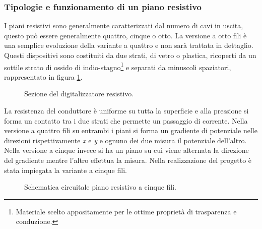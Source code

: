 \documentclass[11pt]{article}
\begin{document}
\subsubsection{Tipologie e funzionamento di un piano resistivo}\label{tipofunz}
I piani resistivi sono generalmente caratterizzati dal numero di cavi in uscita, questo può essere generalmente quattro, cinque o otto. La versione a otto fili è una semplice evoluzione della variante a quattro e non sarà trattata in dettaglio. Questi dispositivi sono costituiti da due strati, di vetro o plastica, ricoperti da un sottile strato di ossido di indio-stagno\footnote{Materiale scelto appositamente per le ottime proprietà di trasparenza e conduzione.} e separati da minuscoli spaziatori, rappresentato in figura \ref{fig:sezione}. 
\begin{figure}[h!]
\centering
{}
\caption{Sezione del digitalizzatore resistivo.} \label{fig:sezione}
\end{figure}
La resistenza del conduttore è uniforme su tutta la superficie e alla pressione si forma un contatto tra i due strati che permette un passaggio di corrente.
Nella versione a quattro fili su entrambi i piani si forma un gradiente di potenziale nelle direzioni rispettivamente \emph{x} e \emph{y} e ognuno dei due misura il potenziale dell'altro. Nella versione a cinque invece si ha un piano su cui viene alternata la direzione del gradiente mentre l'altro effettua la misura.
Nella realizzazione del progetto è stata impiegata la variante a cinque fili.
\begin{figure}[h!]
\centering
{}
\caption{Schematica circuitale piano resistivo a cinque fili.} \label{fig:controllo}
\end{figure}
\end{document}
